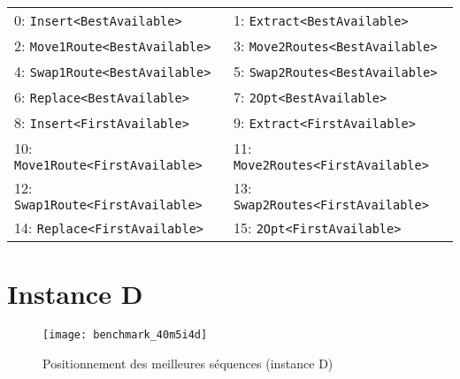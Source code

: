 	\begin{tabular}{ll}
		0: \texttt{Insert<BestAvailable>} & 1: \texttt{Extract<BestAvailable>}\\
		2: \texttt{Move1Route<BestAvailable>} &	3: \texttt{Move2Routes<BestAvailable>}\\
		4: \texttt{Swap1Route<BestAvailable>} & 5: \texttt{Swap2Routes<BestAvailable>}\\
		6: \texttt{Replace<BestAvailable>} & 7: \texttt{2Opt<BestAvailable>}\\
		8: \texttt{Insert<FirstAvailable>} & 9: \texttt{Extract<FirstAvailable>}\\
		10: \texttt{Move1Route<FirstAvailable>} & 11: \texttt{Move2Routes<FirstAvailable>}\\
		12: \texttt{Swap1Route<FirstAvailable>} & 13: \texttt{Swap2Routes<FirstAvailable>}\\
		14: \texttt{Replace<FirstAvailable>} & 15: \texttt{2Opt<FirstAvailable>} \\
	\end{tabular}

	\section*{Instance D}

	\begin{figure}[H]
		\centering
		\texttt{[image: benchmark\_40m5i4d]}
		\caption{Positionnement des meilleures séquences (instance D)}
		\label{fig:best-seq-instanceD}
	\end{figure}


